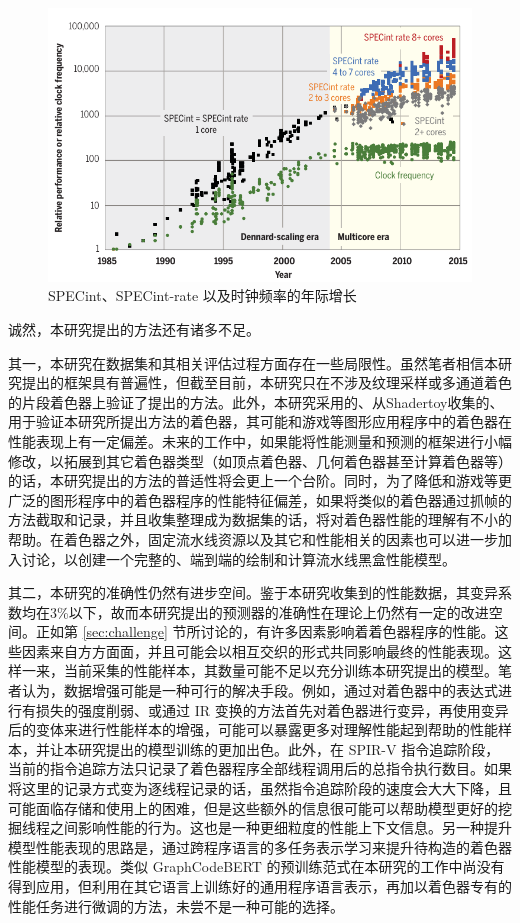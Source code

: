 \begin{figure}
    \centering
    \includegraphics{figures/SPECint.pdf}
    \caption{SPECint、SPECint-rate 以及时钟频率的年际增长 \cite{doi:10.1126/science.aam9744}}
    \label{fig:specint}
\end{figure}

诚然，本研究提出的方法还有诸多不足。

其一，本研究在数据集和其相关评估过程方面存在一些局限性。虽然笔者相信本研究提出的框架具有普遍性，但截至目前，本研究只在不涉及纹理采样或多通道着色的片段着色器上验证了提出的方法。此外，本研究采用的、从Shadertoy收集的、用于验证本研究所提出方法的着色器，其可能和游戏等图形应用程序中的着色器在性能表现上有一定偏差。未来的工作中，如果能将性能测量和预测的框架进行小幅修改，以拓展到其它着色器类型（如顶点着色器、几何着色器甚至计算着色器等）的话，本研究提出的方法的普适性将会更上一个台阶。同时，为了降低和游戏等更广泛的图形程序中的着色器程序的性能特征偏差，如果将类似的着色器通过抓帧的方法截取和记录，并且收集整理成为数据集的话，将对着色器性能的理解有不小的帮助。在着色器之外，固定流水线资源以及其它和性能相关的因素也可以进一步加入讨论，以创建一个完整的、端到端的绘制和计算流水线黑盒性能模型。

其二，本研究的准确性仍然有进步空间。鉴于本研究收集到的性能数据，其变异系数均在3\%以下，故而本研究提出的预测器的准确性在理论上仍然有一定的改进空间。正如第 \ref{sec:challenge} 节所讨论的，有许多因素影响着着色器程序的性能。这些因素来自方方面面，并且可能会以相互交织的形式共同影响最终的性能表现。这样一来，当前采集的性能样本，其数量可能不足以充分训练本研究提出的模型。笔者认为，数据增强可能是一种可行的解决手段。例如，通过对着色器中的表达式进行有损失的强度削弱、或通过 IR 变换的方法首先对着色器进行变异，再使用变异后的变体来进行性能样本的增强，可能可以暴露更多对理解性能起到帮助的性能样本，并让本研究提出的模型训练的更加出色。此外，在 SPIR-V 指令追踪阶段，当前的指令追踪方法只记录了着色器程序全部线程调用后的总指令执行数目。如果将这里的记录方式变为逐线程记录的话，虽然指令追踪阶段的速度会大大下降，且可能面临存储和使用上的困难，但是这些额外的信息很可能可以帮助模型更好的挖掘线程之间影响性能的行为。这也是一种更细粒度的性能上下文信息。另一种提升模型性能表现的思路是，通过跨程序语言的多任务表示学习来提升待构造的着色器性能模型的表现。类似 GraphCodeBERT \cite{DBLP:conf/iclr/GuoRLFT0ZDSFTDC21}的预训练范式在本研究的工作中尚没有得到应用，但利用在其它语言上训练好的通用程序语言表示，再加以着色器专有的性能任务进行微调的方法，未尝不是一种可能的选择。

